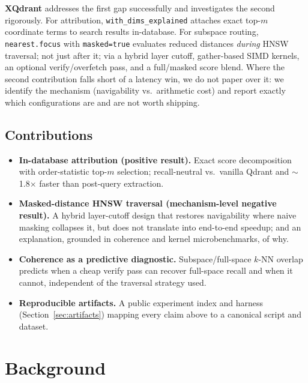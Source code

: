 \documentclass[sigconf,review,balance=false]{acmart}
\begin{document}
\textbf{XQdrant} addresses the first gap successfully and investigates the
second rigorously. For attribution, \texttt{with\_dims\_explained} attaches
exact top-$m$ coordinate terms to search results in-database. For subspace
routing, \texttt{nearest.focus} with \texttt{masked=true} evaluates reduced
distances \emph{during} HNSW traversal; not just after it; via a hybrid layer
cutoff, gather-based SIMD kernels, an optional verify/overfetch pass, and a
full/masked score blend. Where the second contribution falls short of a
latency win, we do not paper over it: we identify the mechanism (navigability
vs.\ arithmetic cost) and report exactly which configurations are and are not
worth shipping.

\subsection*{Contributions}
\vspace{-0.35em}
\begin{itemize}
  \setlength{\itemsep}{0.2em}
  \setlength{\parsep}{0pt}
  \setlength{\topsep}{0.15em}
  \setlength{\partopsep}{0pt}
  \item \textbf{In-database attribution (positive result).} Exact score
    decomposition with order-statistic top-$m$ selection; recall-neutral vs.\
    vanilla Qdrant and $\sim$1.8$\times$ faster than post-query extraction.
  \item \textbf{Masked-distance HNSW traversal (mechanism-level negative
    result).} A hybrid layer-cutoff design that restores navigability where
    naive masking collapses it, but does not translate into end-to-end
    speedup; and an explanation, grounded in coherence and kernel
    microbenchmarks, of why.
  \item \textbf{Coherence as a predictive diagnostic.} Subspace/full-space
    $k$-NN overlap predicts when a cheap verify pass can recover full-space
    recall and when it cannot, independent of the traversal strategy used.
  \item \textbf{Reproducible artifacts.} A public experiment index and harness
    (Section~\ref{sec:artifacts}) mapping every claim above to a canonical
    script and dataset.
\end{itemize}

\section{Background}
\label{sec:background}
\end{document}
